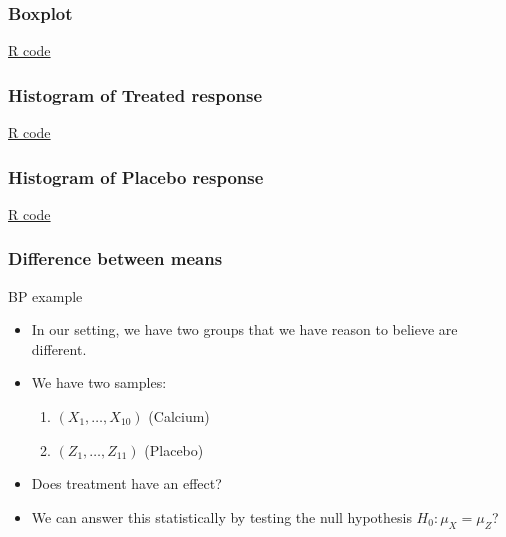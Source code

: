 \documentclass[handout]{beamer}
\begin{document}
   \begin{frame}
   \frametitle{Boxplot}
   \begin{center}
   \end{center}
   \href{http://stats191.stanford.edu/review.html}{R code}
   \end{frame}



   \begin{frame}
   \frametitle{Histogram of Treated response}
   \begin{center}
   \end{center}
   \href{http://stats191.stanford.edu/review.html}{R code}
   \end{frame}



   \begin{frame}
   \frametitle{Histogram of Placebo response}
   \begin{center}
   \end{center}
   \href{http://stats191.stanford.edu/review.html}{R code}
   \end{frame}


   \begin{frame} \frametitle{Difference between means}

   \begin{block}
   {BP example}
   \begin{itemize}
   \item In our setting, we have two groups that we have reason to believe are different.
   \item We have two samples:
   \begin{enumerate}
   \item $(X_1, \dots, X_{10})$ (Calcium)
   \item  $(Z_1, \dots, Z_{11})$ (Placebo)
   \end{enumerate}
   \item Does treatment have an effect?
   \item We can answer this statistically by testing the null hypothesis  $H_0:\mu_X = \mu_Z$?
   \end{itemize}
   \end{block}
   \end{frame}
\end{document}

